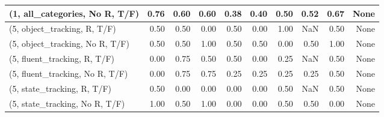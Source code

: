 \begin{table*}[h!]
\begin{adjustbox}{width=2\columnwidth,center}
\begin{tabular}{lrrr|rrr|rrr}
(1, all\_categories, No R, T/F)       &                      0.76 &                  0.60 &                      0.60 &                          0.38 &                      0.40 &                          0.50 &                                   0.52 &                               0.67 &                                  None \\



\midrule
(5, object\_tracking, R, T/F)         &                      0.50 &                  0.50 &                      0.00 &                          0.50 &                      0.00 &                          1.00 &                                    NaN &                               0.50 &                                  None \\
(5, object\_tracking, No R, T/F)      &                      0.50 &                  0.50 &                      1.00 &                          0.50 &                      0.50 &                          0.00 &                                   0.50 &                               1.00 &                                  None \\
(5, fluent\_tracking, R, T/F)         &                      0.00 &                  0.75 &                      0.50 &                          0.50 &                      0.00 &                          0.25 &                                    NaN &                               0.50 &                                  None \\
(5, fluent\_tracking, No R, T/F)      &                      0.00 &                  0.75 &                      0.75 &                          0.25 &                      0.25 &                          0.25 &                                   0.25 &                               0.50 &                                  None \\
(5, state\_tracking, R, T/F)          &                      0.50 &                  0.00 &                      0.00 &                          0.00 &                      0.00 &                          0.50 &                                    NaN &                               0.50 &                                  None \\
(5, state\_tracking, No R, T/F)       &                      1.00 &                  0.50 &                      1.00 &                          0.00 &                      0.00 &                          0.50 &                                   0.50 &                               0.00 &                                  None \\

\end{tabular}
\end{adjustbox}
\end{table*}
